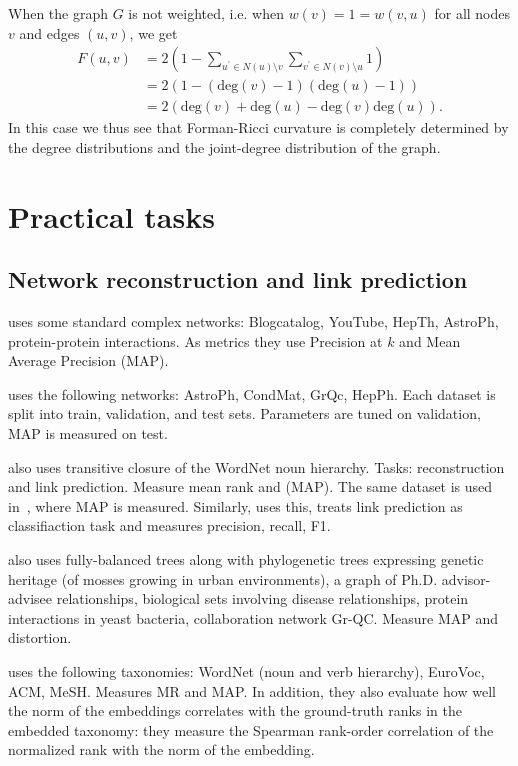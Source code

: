 \documentclass{article}
\begin{document}
When the graph $G$ is not weighted, i.e. when $w(v) = 1 = w(v,u)$ for all nodes $v$ and edges $(u,v)$, we get
\begin{align*}
	F(u,v) &= 2 \left(1 - \sum_{u^\prime \in N(u)\setminus v} \sum_{v^\prime \in N(v) \setminus u} 1 \right) \\
	&= 2\left(1 - (\mathrm{deg}(v) - 1)(\mathrm{deg}(u) - 1)\right) \\
	&= 2\left(\mathrm{deg}(v) + \mathrm{deg}(u) - \mathrm{deg}(v)\mathrm{deg}(u)\right).
\end{align*}
In this case we thus see that Forman-Ricci curvature is completely determined by the degree distributions and the joint-degree distribution of the graph.
                     
\section{Practical tasks}

\subsection{Network reconstruction and link prediction}

\cite{goyal2018graph} uses some standard complex networks: Blogcatalog, YouTube, HepTh, AstroPh, protein-protein interactions. As metrics they use Precision at $k$ and Mean Average Precision (MAP).

\cite{nickel2017poincare} uses the following networks: AstroPh, CondMat, GrQc, HepPh. Each dataset is split into train, validation, and test sets. Parameters are tuned on validation, MAP is measured on test. 

\cite{nickel2017poincare} also uses transitive closure of the WordNet noun hierarchy. Tasks: reconstruction and link prediction. Measure mean rank and (MAP).  The same dataset is used in~\cite{sala2018representation}, where MAP is measured. Similarly, \cite{ganea2018hyperbolic} uses this, treats link prediction as classifiaction task and measures precision, recall, F1.

\cite{sala2018representation} also uses fully-balanced trees along with phylogenetic trees expressing genetic heritage (of mosses growing in urban
environments), a graph of Ph.D. advisor-advisee relationships, biological sets involving disease relationships, protein interactions in yeast bacteria, collaboration network Gr-QC. Measure MAP and distortion. 

\cite{nickel2018learning} uses the following taxonomies: WordNet (noun and verb hierarchy), EuroVoc, ACM, MeSH. Measures MR and MAP. In addition, they also evaluate how well the norm of the embeddings  correlates with
the ground-truth ranks in the embedded taxonomy: they measure the Spearman rank-order correlation of the normalized rank with the norm of the embedding. 
 
\end{document}
